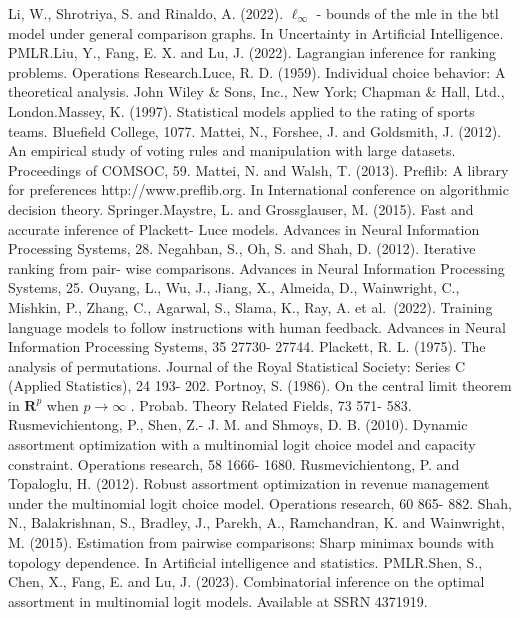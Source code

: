 Li, W., Shrotriya, S. and Rinaldo, A. (2022). \(\ell_{\infty}\) - bounds
of the mle in the btl model under general comparison graphs. In
Uncertainty in Artificial Intelligence. PMLR.Liu, Y., Fang, E. X. and
Lu, J. (2022). Lagrangian inference for ranking problems. Operations
Research.Luce, R. D. (1959). Individual choice behavior: A theoretical
analysis. John Wiley \& Sons, Inc., New York; Chapman \& Hall, Ltd.,
London.Massey, K. (1997). Statistical models applied to the rating of
sports teams. Bluefield College, 1077. Mattei, N., Forshee, J. and
Goldsmith, J. (2012). An empirical study of voting rules and
manipulation with large datasets. Proceedings of COMSOC, 59. Mattei, N.
and Walsh, T. (2013). Preflib: A library for preferences
http://www.preflib.org. In International conference on algorithmic
decision theory. Springer.Maystre, L. and Grossglauser, M. (2015). Fast
and accurate inference of Plackett- Luce models. Advances in Neural
Information Processing Systems, 28. Negahban, S., Oh, S. and Shah, D.
(2012). Iterative ranking from pair- wise comparisons. Advances in
Neural Information Processing Systems, 25. Ouyang, L., Wu, J., Jiang,
X., Almeida, D., Wainwright, C., Mishkin, P., Zhang, C., Agarwal, S.,
Slama, K., Ray, A. et al.~(2022). Training language models to follow
instructions with human feedback. Advances in Neural Information
Processing Systems, 35 27730- 27744. Plackett, R. L. (1975). The
analysis of permutations. Journal of the Royal Statistical Society:
Series C (Applied Statistics), 24 193- 202. Portnoy, S. (1986). On the
central limit theorem in \(\mathbf{R}^p\) when \(p \to \infty\) .
Probab. Theory Related Fields, 73 571- 583. Rusmevichientong, P., Shen,
Z.- J. M. and Shmoys, D. B. (2010). Dynamic assortment optimization with
a multinomial logit choice model and capacity constraint. Operations
research, 58 1666- 1680. Rusmevichientong, P. and Topaloglu, H. (2012).
Robust assortment optimization in revenue management under the
multinomial logit choice model. Operations research, 60 865- 882. Shah,
N., Balakrishnan, S., Bradley, J., Parekh, A., Ramchandran, K. and
Wainwright, M. (2015). Estimation from pairwise comparisons: Sharp
minimax bounds with topology dependence. In Artificial intelligence and
statistics. PMLR.Shen, S., Chen, X., Fang, E. and Lu, J. (2023).
Combinatorial inference on the optimal assortment in multinomial logit
models. Available at SSRN 4371919.

